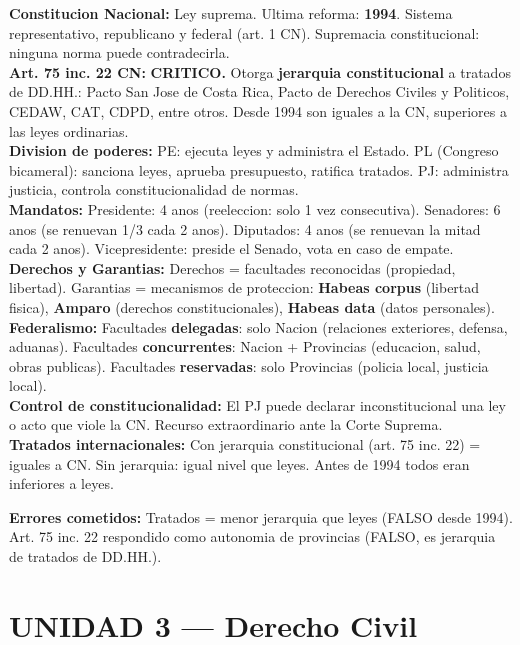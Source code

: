 \documentclass[10pt, a4paper]{article}
\newcommand{\D}[2]{\textbf{\color{azul}#1:} #2\\[1pt]}
\newcommand{\mal}[1]{\textbf{\color{rojo}#1}}
\newcommand{\alerta}[1]{\textbf{\color{naranja}#1}}
\begin{document}
\begin{cajaClave}
\D{Constitucion Nacional}{Ley suprema. Ultima reforma: \textbf{1994}. Sistema representativo, republicano y federal (art. 1 CN). Supremacia constitucional: ninguna norma puede contradecirla.}
\D{Art. 75 inc. 22 CN}{\alerta{CRITICO.} Otorga \textbf{jerarquia constitucional} a tratados de DD.HH.: Pacto San Jose de Costa Rica, Pacto de Derechos Civiles y Politicos, CEDAW, CAT, CDPD, entre otros. Desde 1994 son iguales a la CN, superiores a las leyes ordinarias.}
\D{Division de poderes}{PE: ejecuta leyes y administra el Estado. PL (Congreso bicameral): sanciona leyes, aprueba presupuesto, ratifica tratados. PJ: administra justicia, controla constitucionalidad de normas.}
\D{Mandatos}{Presidente: 4 anos (reeleccion: solo 1 vez consecutiva). Senadores: 6 anos (se renuevan 1/3 cada 2 anos). Diputados: 4 anos (se renuevan la mitad cada 2 anos). Vicepresidente: preside el Senado, vota en caso de empate.}
\D{Derechos y Garantias}{Derechos = facultades reconocidas (propiedad, libertad). Garantias = mecanismos de proteccion: \textbf{Habeas corpus} (libertad fisica), \textbf{Amparo} (derechos constitucionales), \textbf{Habeas data} (datos personales).}
\D{Federalismo}{Facultades \textbf{delegadas}: solo Nacion (relaciones exteriores, defensa, aduanas). Facultades \textbf{concurrentes}: Nacion + Provincias (educacion, salud, obras publicas). Facultades \textbf{reservadas}: solo Provincias (policia local, justicia local).}
\D{Control de constitucionalidad}{El PJ puede declarar inconstitucional una ley o acto que viole la CN. Recurso extraordinario ante la Corte Suprema.}
\D{Tratados internacionales}{Con jerarquia constitucional (art. 75 inc. 22) = iguales a CN. Sin jerarquia: igual nivel que leyes. Antes de 1994 todos eran inferiores a leyes.}
\end{cajaClave}

\begin{cajaError}
\mal{Errores cometidos:} Tratados = menor jerarquia que leyes (FALSO desde 1994). Art. 75 inc. 22 respondido como autonomia de provincias (FALSO, es jerarquia de tratados de DD.HH.).
\end{cajaError}

\section*{UNIDAD 3 --- Derecho Civil}
\end{document}
